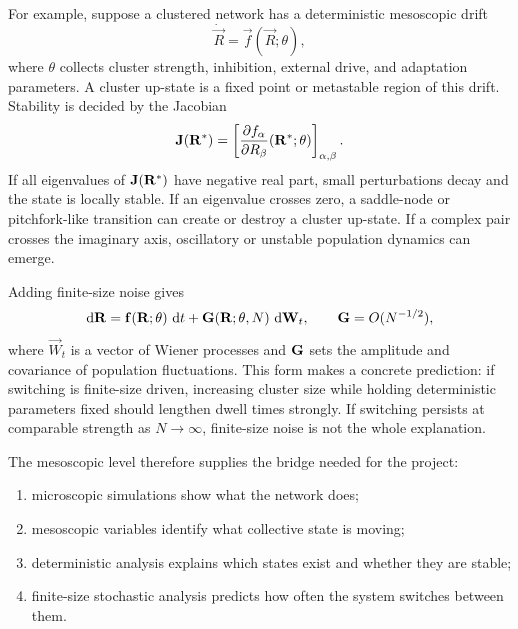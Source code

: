 For example, suppose a clustered network has a deterministic mesoscopic drift
%
\begin{equation}
  \dot{\vec R} = \vec f(\vec R;\theta),
  \label{eq:deterministic-mesoscopic-drift}
\end{equation}
%
where $\theta$ collects cluster strength, inhibition, external drive, and adaptation parameters. A cluster up-state is a fixed point or metastable region of this drift. Stability is decided by the Jacobian
%
\begin{equation}
  \mathbf{J}(\mathbf{R}^*) =
  \left[
    \frac{\partial f_\alpha}{\partial R_\beta}(\mathbf{R}^*;\theta)
  \right]_{\alpha,\beta}.
  \label{eq:mesoscopic-jacobian}
\end{equation}
%
If all eigenvalues of $\mathbf{J}(\mathbf{R}^*)$ have negative real part, small perturbations decay and the state is locally stable. If an eigenvalue crosses zero, a saddle-node or pitchfork-like transition can create or destroy a cluster up-state. If a complex pair crosses the imaginary axis, oscillatory or unstable population dynamics can emerge.

Adding finite-size noise gives
%
\begin{equation}
  \mathop{}\!\mathrm{d} \mathbf{R}
  =
  \mathbf{f}(\mathbf{R};\theta)\,\mathop{}\!\mathrm{d} t
  +
  \mathbf{G}(\mathbf{R};\theta,N)\,\mathop{}\!\mathrm{d} \mathbf{W}_t,
  \qquad
  \mathbf{G} = O(N^{-1/2}),
  \label{eq:mesoscopic-sde-general}
\end{equation}
%
where $\vec W_t$ is a vector of Wiener processes and $\mathbf{G}$ sets the amplitude and covariance of population fluctuations. This form makes a concrete prediction: if switching is finite-size driven, increasing cluster size while holding deterministic parameters fixed should lengthen dwell times strongly. If switching persists at comparable strength as $N\to\infty$, finite-size noise is not the whole explanation.

The mesoscopic level therefore supplies the bridge needed for the project:
%
\begin{enumerate}[leftmargin=*]
  \item microscopic simulations show what the network does;
  \item mesoscopic variables identify what collective state is moving;
  \item deterministic analysis explains which states exist and whether they are stable;
  \item finite-size stochastic analysis predicts how often the system switches between them.
\end{enumerate}

